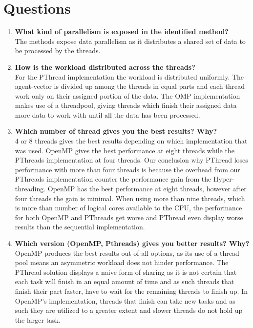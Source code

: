 \documentclass[a4paper,11pt]{article}
\begin{document}
\section{Questions}
\begin{enumerate}[label=\Alph*.]
\item \textbf{What kind of parallelism is exposed in the identified
method?}\\
The methods expose data parallelism as it distributes a shared set of data to be processed by the threads.
\item \textbf{How is the workload distributed across the threads?}\\
For the PThread implementation the workload is distributed uniformly. The agent-vector is divided
up among the threads in equal parts and each thread work only on their assigned portion of the data.
The OMP implementation makes use of a threadpool, giving threads which finish their assigned data more data
to work with until all the data has been processed.
\item \textbf{Which number of thread gives you the best results?
Why?}\\ 4 or 8 threads gives the best results depending on which
implementation that was used. OpenMP gives the best performance at eight
threads while the PThreads implementation at four threads. Our
conclusion why PThread loses performance with more than four threads is
because the overhead from our PThreads implementation counter the
performance gain from the Hyper-threading. OpenMP has the best
performance at eight threads, however after four threads the gain is
minimal. When using more than nine threads, which is more than number of
logical cores available to the CPU, the performance for both OpenMP and PThreads get
worse and PThread even display worse results than the sequential implementation.
\item \textbf{Which version (OpenMP, Pthreads) gives you better
results? Why?}\\
OpenMP produces the best results out of all options, as its use of a thread pool means an
asymmetric workload does not hinder performance. The PThread solution displays a naive form of sharing as
it is not certain that each task will finish in an equal amount of time and as such threads that finish their part
faster, have to wait for the remaining threads to finish up. In OpenMP's implementation, threads that finish can
take new tasks and as such they are utilized to a greater extent and slower threads do not hold up the larger task.
\end{enumerate}
\end{document}
